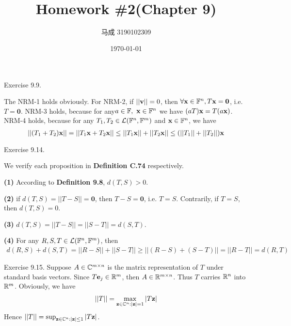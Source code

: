 \documentclass{homework}
\author{马成 3190102309}
\date{\today}
\title{Homework \#2(Chapter 9)}
\begin{document}
 \maketitle

\question Exercise 9.9.

	The NRM-1 holds obviously. For NRM-2, if $||\textbf{v}|| = 0$, then $\forall \textbf{x}\in\mathbb{F}^n, T\textbf{x} = \textbf{0}$, i.e. $T = \textbf{0}$. NRM-3 holds, because for any$ a\in \FF,\ \bx\in\FF^n$ we have $(aT)\textbf{x} = T(a\textbf{x})$. NRM-4 holds, because for any $T_1,T_2 \in \mathcal{L}(\mathbb{F}^n, \mathbb{F}^m)$ and $\textbf{x} \in \mathbb{F}^n$, we have
	\begin{eqnarray}
		||(T_1+T_2)\textbf{x}|| = ||T_1\textbf{x} + T_2\textbf{x}|| \leq ||T_1\textbf{x}|| + ||T_2\textbf{x}|| \leq (||T_1||+||T_2||) \textbf{x}
	\end{eqnarray}
	
\question Exercise 9.14.

	We verify each proposition in \textbf{Definition C.74} respectively. 
	
	\textbf{(1)} According to \textbf{Definition 9.8}, $d(T,S) > 0$. 
	
	\textbf{(2)} if $d(T,S) = ||T-S|| = \textbf{0}$, then $T - S = \textbf{0}$, i.e. $T = S$. Contrarily, if $T = S$, then $d(T,S) = 0$.
	
	\textbf{(3)} $d(T,S) = ||T-S|| = ||S-T|| = d(S,T)$.
	
	\textbf{(4)} For any $R, S, T \in \mathcal{L}(\mathbb{F}^n, \mathbb{F}^m)$, then 
	\begin{eqnarray}
		d(R,S) + d(S,T) = ||R- S|| + ||S -T|| \geq ||(R-S)+(S-T) || = ||R-T|| = d(R,T)
	\end{eqnarray}

\question Exercise 9.15.
	Suppose $A\in \mathbb{C}^{m\times n}$ is the matrix representation of $T$ under standard basis vectors. Since $T\textbf{e}_j\in\mathbb{R}^m$, then $A\in \mathbb{R}^{m\times n}$. Thus $T$ carries $\mathbb{R}^n$ into $\mathbb{R}^m$. Obviously, we have
	\begin{eqnarray}
		||T|| = \max_{\textbf{z}\in\mathbb{C}^n:|\textbf{z}|=1} |T\textbf{z}|
	\end{eqnarray}
	Hence $||T|| = \sup_{\textbf{z}\in\mathbb{C}^n:|\textbf{z}|\leq1} |T\textbf{z}|$.
	
\end{document}
